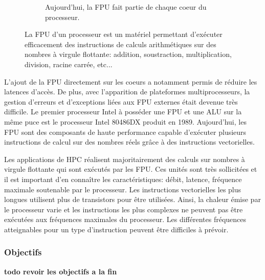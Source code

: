 \begin{figure}
\begin{subfigure}[b]{0.45\linewidth}
                \caption{Aujourd'hui, la FPU fait partie de chaque coeur du processeur.}
                \label{pic_cpu_fpu_recent}
            \end{subfigure}
            \caption{La FPU d'un processeur est un matériel permettant d'exécuter efficacement des instructions de calculs arithmétiques sur des nombres à virgule flottante: addition, soustraction, multiplication, division, racine carrée, etc...\protect\footnotemark }\label{fig:cacheinclusionpolicy}
        \end{figure}
        
        L'ajout de la FPU directement sur les coeurs a notamment permis de réduire les latences d'accès. De plus, avec l'apparition de plateformes multiprocesseurs, la gestion d'erreurs et d'exceptions liées aux FPU externes était devenue très difficile. Le premier processeur Intel à posséder une FPU et une ALU sur la même puce est le processeur Intel 80486DX produit en 1989.  Aujourd'hui, les FPU sont des composants de haute performance capable d'exécuter plusieurs instructions de calcul sur des nombres réels grâce à des instructions vectorielles.  

        
        
        Les applications de HPC réalisent majoritairement des calculs sur nombres à virgule flottante qui sont exécutés par les FPU. Ces unités sont très sollicitées et il est important d'en connaître les caractéristiques: débit, latence, fréquence maximale soutenable par le processeur. Les instructions vectorielles les plus longues utilisent plus de transistors pour être utilisées. Ainsi, la chaleur émise par le processeur varie et les instructions les plus complexes ne peuvent pas être exécutées aux fréquences maximales du processeur. Les différentes fréquences atteignables pour un type d'instruction peuvent être difficiles à prévoir.
        
       
       
    \subsubsection{Objectifs}
    \textbf{todo revoir les objectifs a la fin}
    
